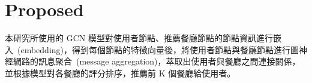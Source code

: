 \section{Proposed}
本研究所使用的 GCN 模型對使用者節點、推薦餐廳節點的節點資訊進行嵌入~(embedding)，得到每個節點的特徵向量後，將使用者節點與餐廳節點進行圖神經網路的訊息聚合~(message aggregation)，萃取出使用者與餐廳之間連接關係，並根據模型對各餐廳的評分排序，推薦前 K 個餐廳給使用者。
